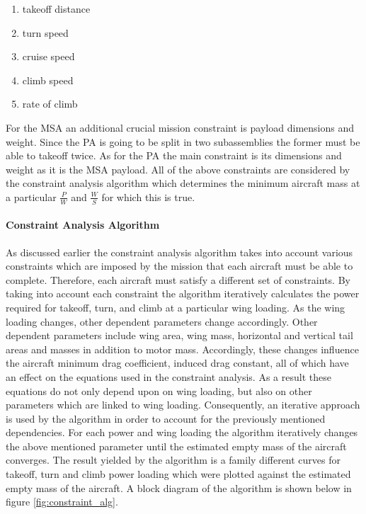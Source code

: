 \begin{enumerate}
    \item takeoff distance
    \item turn speed
    \item cruise speed
    \item climb speed
    \item rate of climb
\end{enumerate}

For the MSA an additional crucial mission constraint is payload dimensions and weight. Since the PA is going to be split in two subassemblies the former must be able to takeoff twice. As for the PA the main constraint is its dimensions and weight as it is the MSA payload. All of the above constraints are considered by the constraint analysis algorithm which determines the minimum aircraft mass at a particular $\frac{P}{W}$ and $\frac{W}{S}$ for which this is true.

\paragraph{Constraint Analysis Algorithm}

As discussed earlier the constraint analysis algorithm takes into account various constraints which are imposed by the mission that each aircraft must be able to complete. Therefore, each aircraft must satisfy a different set of constraints. By taking into account each constraint the algorithm iteratively calculates the power required for takeoff, turn, and climb at a particular wing loading. As the wing loading changes, other dependent parameters change accordingly. Other dependent parameters include wing area, wing mass, horizontal and vertical tail areas and masses in addition to motor mass. Accordingly, these changes influence the aircraft minimum drag coefficient, induced drag constant, all of which have an effect on the equations used in the constraint analysis. As a result these equations do not only depend upon on wing loading, but also on other parameters which are linked to wing loading. Consequently, an iterative approach is used by the algorithm in order to account for the previously mentioned dependencies. For each power and wing loading the algorithm iteratively changes the above mentioned parameter until the estimated empty mass of the aircraft converges. The result yielded by the algorithm is a family different curves for takeoff, turn and climb power loading which were plotted against the estimated empty mass of the aircraft.  A block diagram of the algorithm is shown below in figure \ref{fig:constraint_alg}.

